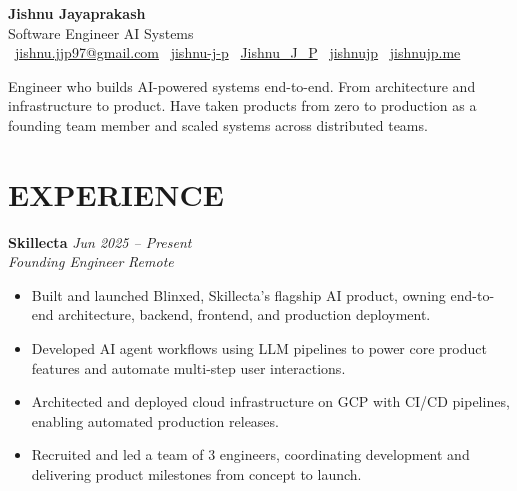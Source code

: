 \documentclass[11pt,a4paper]{article}
\begin{document}
\begin{center}
    {\LARGE\bfseries\textcolor{accent}{Jishnu Jayaprakash}} \\[0.3em]
    Software Engineer \textperiodcentered{} AI Systems \\[0.4em]
    \faEnvelopeO~\href{mailto:jishnu.jjp97@gmail.com}{\textcolor{linkgray}{jishnu.jjp97@gmail.com}} \quad
    \faLinkedinSquare~\href{https://www.linkedin.com/in/jishnu-j-p}{\textcolor{linkgray}{jishnu-j-p}} \quad
    \faTwitter~\href{https://x.com/Jishnu_J_P}{\textcolor{linkgray}{Jishnu\_J\_P}} \quad
    \faGithub~\href{https://github.com/jishnujp}{\textcolor{linkgray}{jishnujp}} \quad
    \faGlobe~\href{https://jishnujp.me}{\textcolor{linkgray}{jishnujp.me}}
\end{center}

\vspace{0.6em}

Engineer who builds AI-powered systems end-to-end. From architecture and infrastructure to product. Have taken products from zero to production as a founding team member and scaled systems across distributed teams.

\vspace{0.2em}

\section*{EXPERIENCE}

\textbf{Skillecta} \hfill \textit{Jun 2025 -- Present} \\
\textit{Founding Engineer} \hfill \textit{Remote}
\begin{itemize}[leftmargin=*, itemsep=2pt, topsep=4pt, parsep=0pt]
    \item Built and launched Blinxed, Skillecta's flagship AI product, owning end-to-end architecture, backend, frontend, and production deployment.
    \item Developed AI agent workflows using LLM pipelines to power core product features and automate multi-step user interactions.
    \item Architected and deployed cloud infrastructure on GCP with CI/CD pipelines, enabling automated production releases.
    \item Recruited and led a team of 3 engineers, coordinating development and delivering product milestones from concept to launch.
\end{itemize}
\end{document}
